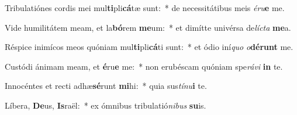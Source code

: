 \item Tribulatiónes cordis mei mul\textbf{ti}pli\textbf{cá}tæ sunt:~* de necessitátibus meis \textit{é}\textit{ru}\textbf{e} me.
\item Vide humilitátem meam, et la\textbf{bó}rem \textbf{me}um:~* et dimítte univérsa de\textit{líc}\textit{ta} \textbf{me}a.
\item Réspice inimícos meos quóniam mul\textbf{ti}pli\textbf{cá}ti sunt:~* et ódio iní\textit{quo} \textit{o}\textbf{dé}\textbf{runt} me.
\item Custódi ánimam meam, et \textbf{é}ru\textbf{e} me:~* non erubéscam quóniam spe\textit{rá}\textit{vi} \textbf{in} te.
\item Innocéntes et recti adhæ\textbf{sé}runt \textbf{mi}hi:~* quia sus\textit{tí}\textit{nu}\textbf{i} te.
\item Líbera, \textbf{De}us, \textbf{Is}raël:~* ex ómnibus tribulatió\textit{ni}\textit{bus} \textbf{su}is.
